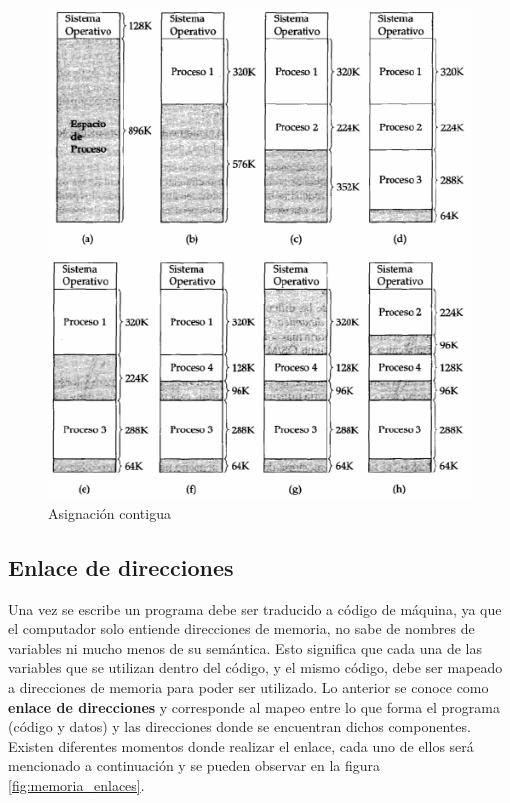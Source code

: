 \begin{figure}[htbp]
\centering
\includegraphics[scale=0.7]{img/C07_memoria/asignacion_contigua.png}
\caption{Asignación contigua}
\label{fig:asignacion_contigua}
\end{figure}

\subsection{Enlace de direcciones}

Una vez se escribe un programa debe ser traducido a código de máquina, ya que el
computador solo entiende direcciones de memoria, no sabe de nombres de variables
ni mucho menos de su semántica. Esto significa que cada una de las variables que
se utilizan dentro del código, y el mismo código, debe ser mapeado a direcciones
de memoria para poder ser utilizado. Lo anterior se conoce como \textbf{enlace
de direcciones} y corresponde al mapeo entre lo que forma el programa (código y
datos) y las direcciones donde se encuentran dichos componentes. Existen
diferentes momentos donde realizar el enlace, cada uno de ellos será mencionado
a continuación y se pueden observar en la figura \ref{fig:memoria_enlaces}.

